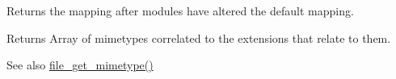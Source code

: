 Returns the mapping after modules have altered the default mapping.

\begin{DoxyReturn}{Returns}
Array of mimetypes correlated to the extensions that relate to them.
\end{DoxyReturn}
\begin{DoxySeeAlso}{See also}
\hyperlink{group__file_ga2f3c500f59ecd606e4022ed9d83a1dec}{file\_\-get\_\-mimetype()} 
\end{DoxySeeAlso}
